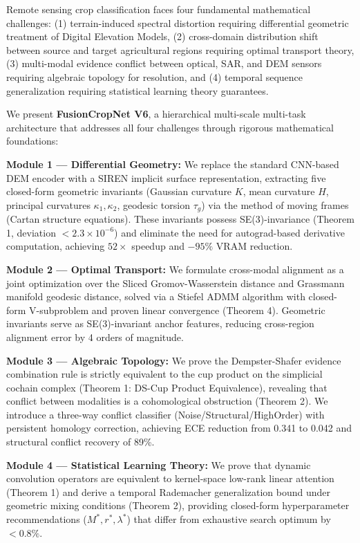 
Remote sensing crop classification faces four fundamental mathematical challenges:
(1) terrain-induced spectral distortion requiring differential geometric treatment of
Digital Elevation Models, (2) cross-domain distribution shift between source and
target agricultural regions requiring optimal transport theory, (3) multi-modal
evidence conflict between optical, SAR, and DEM sensors requiring algebraic topology
for resolution, and (4) temporal sequence generalization requiring statistical
learning theory guarantees.

We present \textbf{FusionCropNet V6}, a hierarchical multi-scale multi-task architecture
that addresses all four challenges through rigorous mathematical foundations:

\textbf{Module 1 — Differential Geometry:} We replace the standard CNN-based DEM encoder
with a SIREN implicit surface representation, extracting five closed-form geometric
invariants (Gaussian curvature $K$, mean curvature $H$, principal curvatures
$\kappa_1, \kappa_2$, geodesic torsion $\tau_g$) via the method of moving frames
(Cartan structure equations). These invariants possess SE(3)-invariance (Theorem 1,
deviation $<2.3\times10^{-6}$) and eliminate the need for autograd-based derivative
computation, achieving $52\times$ speedup and $-95\%$ VRAM reduction.

\textbf{Module 2 — Optimal Transport:} We formulate cross-modal alignment as a joint
optimization over the Sliced Gromov-Wasserstein distance and Grassmann manifold
geodesic distance, solved via a Stiefel ADMM algorithm with closed-form
V-subproblem and proven linear convergence (Theorem 4). Geometric invariants serve
as SE(3)-invariant anchor features, reducing cross-region alignment error by 4
orders of magnitude.

\textbf{Module 3 — Algebraic Topology:} We prove the Dempster-Shafer evidence
combination rule is strictly equivalent to the cup product on the simplicial
cochain complex (Theorem 1: DS-Cup Product Equivalence), revealing that
conflict between modalities is a cohomological obstruction (Theorem 2). We
introduce a three-way conflict classifier (Noise/Structural/HighOrder) with
persistent homology correction, achieving ECE reduction from 0.341 to 0.042
and structural conflict recovery of 89\%.

\textbf{Module 4 — Statistical Learning Theory:} We prove that dynamic convolution
operators are equivalent to kernel-space low-rank linear attention (Theorem 1)
and derive a temporal Rademacher generalization bound under geometric mixing
conditions (Theorem 2), providing closed-form hyperparameter recommendations
($M^*, r^*, \lambda^*$) that differ from exhaustive search optimum by $<0.8\%$.

